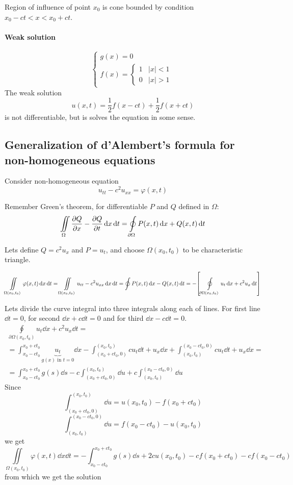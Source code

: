 Region of influence of point $x_0$ is cone bounded by condition $x_0-ct<x<x_0+ct$.
\begin{center}	
	
\end{center}
\paragraph{Weak solution}
$$\begin{cases}
g(x) = 0\\f(x) = \begin{cases}
1 & |x| <1 \\
0 & |x| > 1
\end{cases}
\end{cases}$$
The weak solution
$$u(x,t) = \frac{1}{2}f(x-ct)+\frac{1}{2}f(x+ct)$$
is not differentiable, but is solves the equation in some sense.
\subsection{Generalization of  d'Alembert's formula for non-homogeneous equations}
Consider non-homogeneous equation
$$u_{tt} - c^2 u_{xx} = \varphi(x,t)$$

Remember Green's theorem, for differentiable $P$ and $Q$ defined in $\Omega$:
$$\iint\limits_\Omega \pdv{Q}{x} - \pdv{Q}{t} \dd{x} \dd{t} = \oint\limits_{\partial \Omega} P(x,t) \dd{x} + Q(x,t) \dd{t}$$

Lets define $Q=c^2u_x$ and $P=u_t$, and choose $\Omega(x_0, t_0)$ to be characteristic triangle.

$$\iint\limits_{\Omega(x_0, t_0)} \varphi(x,t) \dd{x} \dd{t} = \iint\limits_{\Omega(x_0, t_0)} u_{tt} - c^2 u_{xx} \dd{x} \dd{t} = \oint P(x,t) \dd{x} - Q(x,t) \dd{t} = - \qty[\oint\limits_{\partial \Omega(x_0, t_0)} u_t \dd{x} + c^2u_x \dd{t}] $$

Lets divide the curve integral into three integrals along each of lines. For first line $\dd{t} = 0$, for second $\dd{x} + c\dd{t} = 0$ and for third $\dd{x} - c\dd{t} = 0$.
\begin{align*}
\oint\limits_{\partial \Omega(x_0, t_0)} u_t \dd{x} + c^2u_x \dd{t} =\\= \int_{x_0-ct_0}^{x_0+ct_0} \underbrace{u_t}_{g(x) \text{ in } t=0} \dd{x} - \int_{(x_0+ct_0,0)}^{(x_0, t_0)} cu_t \dd{t} + u_x \dd{x} +  \int_{(x_0, t_0)}^{(x_0-ct_0,0)} cu_t \dd{t} + u_x \dd{x} =\\= \int_{x_0-ct_0}^{x_0+ct_0} g(s) \dd{s} - c\int_{(x_0+ct_0,0)}^{(x_0, t_0)} \dd{u} + c \int_{(x_0, t_0)}^{(x_0-ct_0,0)} \dd{u} 
\end{align*}
Since
$$\int_{(x_0+ct_0,0)}^{(x_0, t_0)} \dd{u} = u(x_0, t_0) - f(x_0+ct_0) $$
$$ \int_{(x_0, t_0)}^{(x_0-ct_0,0)} \dd{u} = f(x_0-ct_0) -  u(x_0, t_0) $$
we get
$$\iint\limits_{\Omega(x_0, t_0)} \varphi(x,t) \dd{x} \dd{t} = -\int_{x_0-ct_0}^{x_0+ct_0} g(s) \dd{s} + 2cu(x_0, t_0) - cf(x_0+ct_0) - cf(x_0-ct_0) $$
from which we get the solution

